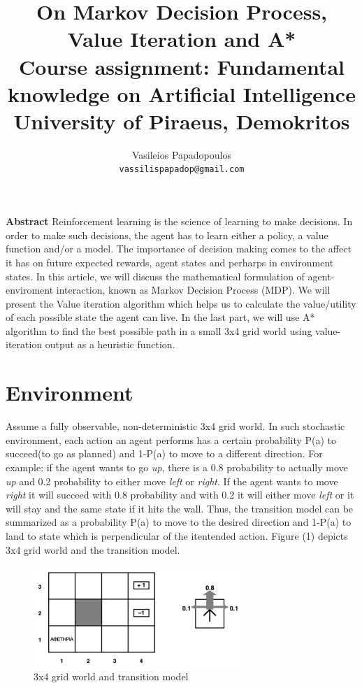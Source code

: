 \documentclass[10pt,a4paper,twocolumn]{article}
\title{%
		On Markov Decision Process, Value Iteration and A* \\
	\large Course assignment: Fundamental knowledge on Artificial Intelligence \\
			University of Piraeus, Demokritos}
\author{Vasileios Papadopoulos \\
		\texttt{vassilispapadop@gmail.com}
}
\begin{document}
	\maketitle
	
	\textbf{Abstract}
	Reinforcement learning is the science of learning to make decisions. In order to make such decisions, the agent has to learn either a policy,	a value function and/or a model. The importance of decision making comes to the affect it has on future expected rewards, agent states and perharps in environment states. In this article, we will discuss the mathematical formulation of agent-enviroment interaction, known as Markov Decision Process (MDP). We will present the Value iteration algorithm which helps us to calculate the value/utility of each possible state the agent can live. In the last part, we will use A* algorithm to find the best possible path in a small 3x4 grid world using value-iteration output as a heuristic function.
	
	
	\section{Environment}
	
	Assume a fully observable, non-deterministic 3x4 grid world. In such stochastic environment, 
	each action an agent performs has a certain probability P(a) to succeed(to go as planned) and 1-P(a) to move to a different direction. 
	For example: if the agent wants to go \textit{up}, there is a 0.8 probability to actually move \textit{up} and 0.2 probability to either move \textit{left} or \textit{right}. If the agent wants to move \textit{right} it will succeed with 0.8 probability and with 0.2 it will either move \textit{left} or it will stay and the same state if it hits the wall. Thus, the transition model can be summarized as a probability P(a) to move to the desired direction and 1-P(a) to land to state which is perpendicular of the itentended action. Figure (1) depicts 3x4 grid world and the transition model.
\begin{figure}[ht!]
	\centering
	\includegraphics[width=80mm]{grid_world}
	\caption{3x4 grid world and transition model \label{overflow}}
\end{figure}
	
\end{document}
